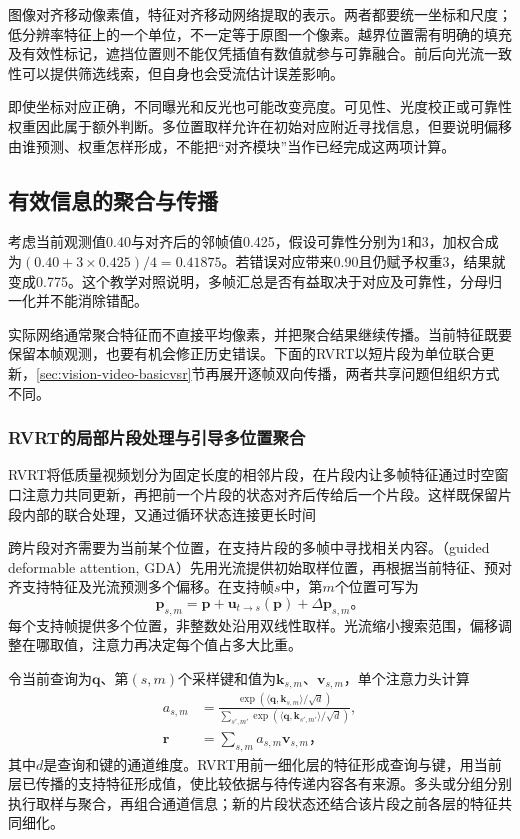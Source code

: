 图像对齐移动像素值，特征对齐移动网络提取的表示。两者都要统一坐标和尺度；低分辨率特征上的一个单位，不一定等于原图一个像素。越界位置需有明确的填充及有效性标记，遮挡位置则不能仅凭插值有数值就参与可靠融合。前后向光流一致性可以提供筛选线索，但自身也会受流估计误差影响。

即使坐标对应正确，不同曝光和反光也可能改变亮度。可见性、光度校正或可靠性权重因此属于额外判断。多位置取样允许在初始对应附近寻找信息，但要说明偏移由谁预测、权重怎样形成，不能把“对齐模块”当作已经完成这两项计算。

\subsection{有效信息的聚合与传播}
\label{sec:vision-video-fusion}

考虑当前观测值0.40与对齐后的邻帧值0.425，假设可靠性分别为1和3，加权合成为$(0.40+3\times0.425)/4=0.41875$。若错误对应带来0.90且仍赋予权重3，结果就变成0.775。这个教学对照说明，多帧汇总是否有益取决于对应及可靠性，分母归一化并不能消除错配。

实际网络通常聚合特征而不直接平均像素，并把聚合结果继续传播。当前特征既要保留本帧观测，也要有机会修正历史错误。下面的RVRT以短片段为单位联合更新，\ref{sec:vision-video-basicvsr}节再展开逐帧双向传播，两者共享问题但组织方式不同。

\subsubsection{RVRT的局部片段处理与引导多位置聚合}
\label{sec:vision-video-rvrt}

RVRT将低质量视频划分为固定长度的相邻片段，在片段内让多帧特征通过时空窗口注意力共同更新，再把前一个片段的状态对齐后传给后一个片段。这样既保留片段内部的联合处理，又通过循环状态连接更长时间

跨片段对齐需要为当前某个位置，在支持片段的多帧中寻找相关内容。（guided deformable attention, GDA）先用光流提供初始取样位置，再根据当前特征、预对齐支持特征及光流预测多个偏移。在支持帧$s$中，第$m$个位置可写为
\[
  \bm{p}_{s,m}=\bm{p}+\bm{u}_{t\to s}(\bm{p})
                   +\Delta\bm{p}_{s,m}\text{。}
\]
每个支持帧提供多个位置，非整数处沿用双线性取样。光流缩小搜索范围，偏移调整在哪取值，注意力再决定每个值占多大比重。

令当前查询为$\bm{q}$、第$(s,m)$个采样键和值为$\bm{k}_{s,m}$、$\bm{v}_{s,m}$，单个注意力头计算
\begin{equation}
  \begin{aligned}
    a_{s,m}&=
      \frac{\exp(\langle\bm{q},\bm{k}_{s,m}\rangle/\sqrt d)}
      {\sum_{s',m'}\exp(\langle\bm{q},\bm{k}_{s',m'}\rangle/\sqrt d)},\\
    \bm{r}&=\sum_{s,m}a_{s,m}\bm{v}_{s,m}\text{，}
  \end{aligned}
  \label{eq:vision-video-gda}
\end{equation}
其中$d$是查询和键的通道维度。RVRT用前一细化层的特征形成查询与键，用当前层已传播的支持特征形成值，使比较依据与待传递内容各有来源。多头或分组分别执行取样与聚合，再组合通道信息；新的片段状态还结合该片段之前各层的特征共同细化。

